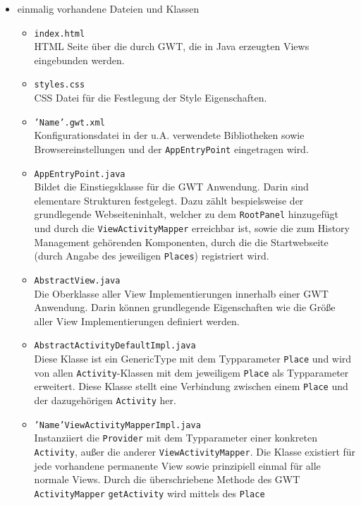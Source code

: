 \begin{itemize}
  \item einmalig vorhandene Dateien und Klassen
  \begin{itemize}
    \item \texttt{index.html}\\
    HTML Seite über die durch GWT, die in Java erzeugten Views
    eingebunden werden.
    \item \texttt{styles.css}\\
    CSS Datei für die Festlegung der Style Eigenschaften.
    \item \texttt{'Name'.gwt.xml}\\
    Konfigurationsdatei in der u.A. verwendete Bibliotheken sowie
    Browsereinstellungen und der \texttt{AppEntryPoint} eingetragen wird.
    \item \texttt{AppEntryPoint.java}\\
    Bildet die Einstiegsklasse für die GWT Anwendung. Darin sind elementare
    Strukturen festgelegt. Dazu zählt bespielsweise der grundlegende
    Webseiteninhalt, welcher zu dem \texttt{RootPanel} hinzugefügt und durch die
    \texttt{ViewActivityMapper} erreichbar ist, sowie die zum
    History Management gehörenden Komponenten, durch die die Startwebseite
    (durch Angabe des jeweiligen \texttt{Places}) registriert wird.
    \item \texttt{AbstractView.java}\\
    Die Oberklasse aller View Implementierungen innerhalb einer GWT
    Anwendung. Darin können grundlegende Eigenschaften wie die Größe aller
    View Implementierungen definiert werden.
    \item \texttt{AbstractActivityDefaultImpl.java}\\
    Diese Klasse ist ein GenericType mit dem Typparameter \texttt{Place} und
    wird von allen \texttt{Activity}-Klassen mit dem jeweiligem
    \texttt{Place} als Typparameter erweitert. 
 	Diese Klasse stellt eine Verbindung zwischen einem \texttt{Place} und der
 	dazugehörigen \texttt{Activity} her.
    \item \texttt{'Name'ViewActivityMapperImpl.java}\\
    Instanziiert die \texttt{Provider} mit dem Typparameter
    einer konkreten \texttt{Activity}, außer die anderer
    \texttt{ViewActivityMapper}. Die Klasse existiert für jede vorhandene
    permanente View sowie prinzipiell einmal für alle normale
    Views. Durch die überschriebene Methode des GWT
    \texttt{ActivityMapper} \texttt{getActivity} wird mittels des \texttt{Place}

\end{itemize}
\end{itemize}

